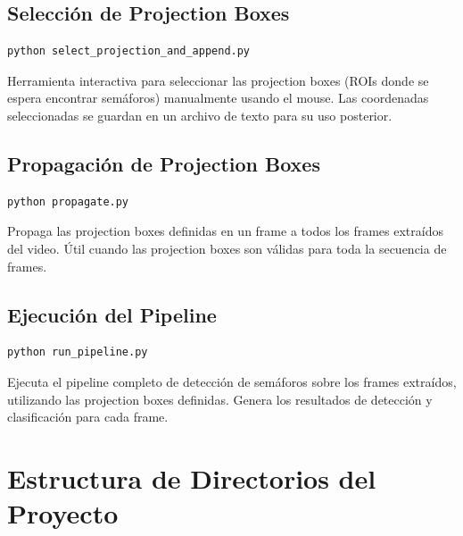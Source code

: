 \subsection{Selección de Projection Boxes}

\begin{codesnippet}
\begin{verbatim}
python select_projection_and_append.py
\end{verbatim}
\end{codesnippet}

Herramienta interactiva para seleccionar las projection boxes (ROIs donde se espera encontrar semáforos) manualmente usando el mouse. Las coordenadas seleccionadas se guardan en un archivo de texto para su uso posterior.

\subsection{Propagación de Projection Boxes}

\begin{codesnippet}
\begin{verbatim}
python propagate.py
\end{verbatim}
\end{codesnippet}

Propaga las projection boxes definidas en un frame a todos los frames extraídos del video. Útil cuando las projection boxes son válidas para toda la secuencia de frames.

\subsection{Ejecución del Pipeline}

\begin{codesnippet}
\begin{verbatim}
python run_pipeline.py
\end{verbatim}
\end{codesnippet}

Ejecuta el pipeline completo de detección de semáforos sobre los frames extraídos, utilizando las projection boxes definidas. Genera los resultados de detección y clasificación para cada frame.

\section{Estructura de Directorios del Proyecto}

